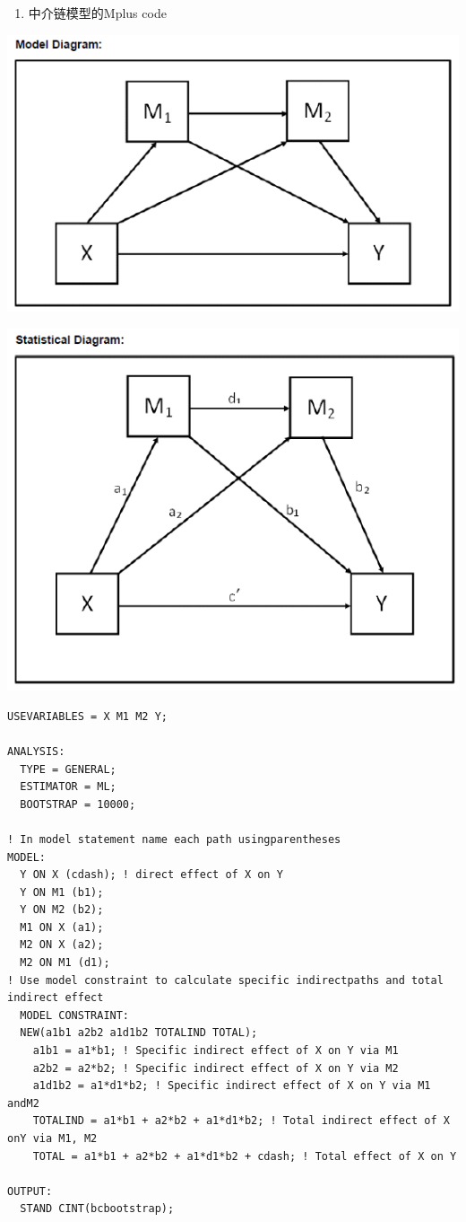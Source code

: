 \documentclass[
]{book}
\providecommand{\tightlist}{%
  \setlength{\itemsep}{0pt}\setlength{\parskip}{0pt}}
\begin{document}
\begin{enumerate}
\def\labelenumi{\arabic{enumi}.}
\setcounter{enumi}{2}
\tightlist
\item
  中介链模型的Mplus code
\end{enumerate}

\includegraphics{figs/1135.png}

\includegraphics{figs/1136.png}

\begin{verbatim}
USEVARIABLES = X M1 M2 Y;

ANALYSIS:
  TYPE = GENERAL;
  ESTIMATOR = ML;
  BOOTSTRAP = 10000;

! In model statement name each path usingparentheses
MODEL:
  Y ON X (cdash); ! direct effect of X on Y
  Y ON M1 (b1);
  Y ON M2 (b2);
  M1 ON X (a1);
  M2 ON X (a2);
  M2 ON M1 (d1);
! Use model constraint to calculate specific indirectpaths and total indirect effect
  MODEL CONSTRAINT:
  NEW(a1b1 a2b2 a1d1b2 TOTALIND TOTAL);
    a1b1 = a1*b1; ! Specific indirect effect of X on Y via M1
    a2b2 = a2*b2; ! Specific indirect effect of X on Y via M2
    a1d1b2 = a1*d1*b2; ! Specific indirect effect of X on Y via M1 andM2
    TOTALIND = a1*b1 + a2*b2 + a1*d1*b2; ! Total indirect effect of X onY via M1, M2
    TOTAL = a1*b1 + a2*b2 + a1*d1*b2 + cdash; ! Total effect of X on Y

OUTPUT:
  STAND CINT(bcbootstrap);
\end{verbatim}
\end{document}
